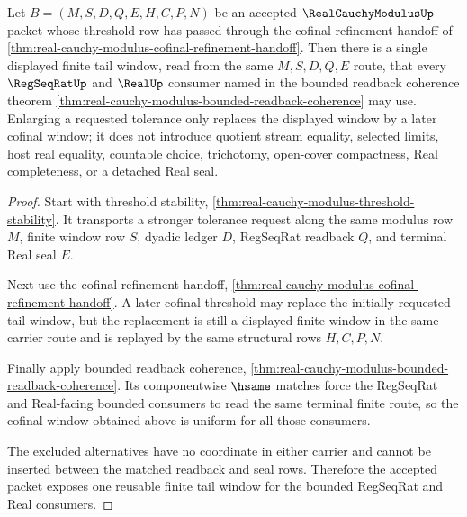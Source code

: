 \begin{theorem}
\label{thm:real-cauchy-modulus-uniform-tail-extraction}
Let $B=(M,S,D,Q,E,H,C,P,N)$ be an accepted $\RealCauchyModulusUp$ packet whose threshold row has passed through the cofinal refinement handoff of \autoref{thm:real-cauchy-modulus-cofinal-refinement-handoff}. Then there is a single displayed finite tail window, read from the same $M,S,D,Q,E$ route, that every $\RegSeqRatUp$ and $\RealUp$ consumer named in the bounded readback coherence theorem \autoref{thm:real-cauchy-modulus-bounded-readback-coherence} may use. Enlarging a requested tolerance only replaces the displayed window by a later cofinal window; it does not introduce quotient stream equality, selected limits, host real equality, countable choice, trichotomy, open-cover compactness, Real completeness, or a detached Real seal.
\end{theorem}
\begin{proof}
Start with threshold stability, \autoref{thm:real-cauchy-modulus-threshold-stability}. It transports a stronger tolerance request along the same modulus row $M$, finite window row $S$, dyadic ledger $D$, RegSeqRat readback $Q$, and terminal Real seal $E$.

Next use the cofinal refinement handoff, \autoref{thm:real-cauchy-modulus-cofinal-refinement-handoff}. A later cofinal threshold may replace the initially requested tail window, but the replacement is still a displayed finite window in the same carrier route and is replayed by the same structural rows $H,C,P,N$.

Finally apply bounded readback coherence, \autoref{thm:real-cauchy-modulus-bounded-readback-coherence}. Its componentwise $\hsame$ matches force the RegSeqRat and Real-facing bounded consumers to read the same terminal finite route, so the cofinal window obtained above is uniform for all those consumers.

The excluded alternatives have no coordinate in either carrier and cannot be inserted between the matched readback and seal rows. Therefore the accepted packet exposes one reusable finite tail window for the bounded RegSeqRat and Real consumers.
\end{proof}

